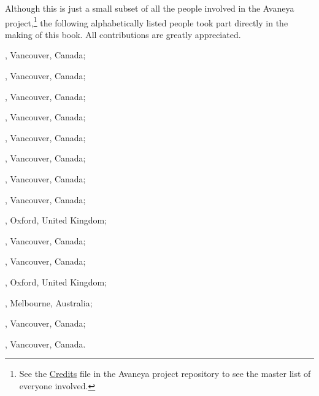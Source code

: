 

Although this is just a small subset of all the people involved in the Avaneya project,\footnote{See the \href{https://bazaar.launchpad.net/~avaneya/avaneya/trunk/view/head:/Credits}{Credits} file in the Avaneya project repository to see the master list of everyone involved.} the following alphabetically listed people took part directly in the making of this book. All contributions are greatly appreciated.



\startitemize[joinedup]
\item {}, Vancouver, Canada;
\item {}, Vancouver, Canada;
\item {}, Vancouver, Canada;
\item {}, Vancouver, Canada;
\item {}, Vancouver, Canada;
\item {}, Vancouver, Canada;
\item {}, Vancouver, Canada;
\item {}, Vancouver, Canada;
\item {}, Oxford, United Kingdom;
\item {}, Vancouver, Canada;
\stopitemize


\startitemize[joinedup]
\item {}, Vancouver, Canada;
\item {}, Oxford, United Kingdom;
\stopitemize


\startitemize[joinedup]
\item {}, Melbourne, Australia;
\item {}, Vancouver, Canada;
\stopitemize


\startitemize[joinedup]
\item {}, Vancouver, Canada.
\stopitemize

\StopChapter

